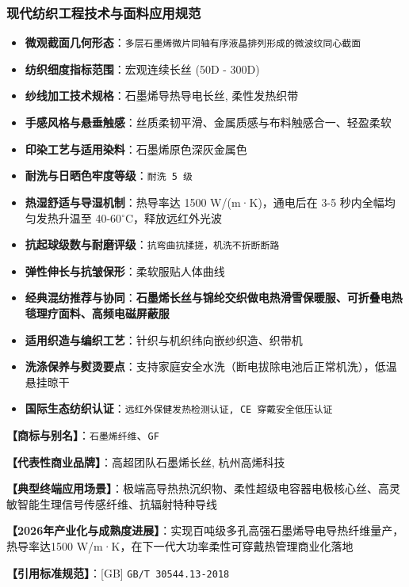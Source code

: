 \documentclass[11pt,openright,twoside,UTF8]{ctexbook}
\begin{document}
\subsubsection*{现代纺织工程技术与面料应用规范}
\begin{itemize} \setlength{\itemsep}{2pt}
    \item \textbf{微观截面几何形态}：\texttt{多层石墨烯微片同轴有序液晶排列形成的微波纹同心截面}
    \item \textbf{纺织细度指标范围}：宏观连续长丝 (50D - 300D)
    \item \textbf{纱线加工技术规格}：石墨烯导热导电长丝, 柔性发热织带
    \item \textbf{手感风格与悬垂触感}：丝质柔韧平滑、金属质感与布料触感合一、轻盈柔软
    \item \textbf{印染工艺与适用染料}：石墨烯原色深灰金属色
    \item \textbf{耐洗与日晒色牢度等级}：\texttt{耐洗 5 级}
    \item \textbf{热湿舒适与导湿机制}：热导率达 1500 W/(m·K)，通电后在 3-5 秒内全幅均匀发热升温至 40-60$^\circ\mathrm{C}$，释放远红外光波
    \item \textbf{抗起球级数与耐磨评级}：\texttt{抗弯曲抗揉搓，机洗不折断断路}
    \item \textbf{弹性伸长与抗皱保形}：柔软服贴人体曲线
    \item \textbf{经典混纺推荐与协同}：\textbf{石墨烯长丝与锦纶交织做电热滑雪保暖服、可折叠电热毯理疗面料、高频电磁屏蔽服}
    \item \textbf{适用织造与编织工艺}：针织与机织纬向嵌纱织造、织带机
    \item \textbf{洗涤保养与熨烫要点}：支持家庭安全水洗（断电拔除电池后正常机洗），低温悬挂晾干
    \item \textbf{国际生态纺织认证}：\texttt{远红外保健发热检测认证, CE 穿戴安全低压认证}
\end{itemize}
\vspace{0.2cm}

\noindent\textbf{【商标与别名】}：\texttt{石墨烯纤维}、\texttt{GF}\par
\noindent\textbf{【代表性商业品牌】}：高超团队石墨烯长丝, 杭州高烯科技\par
\noindent\textbf{【典型终端应用场景】}：极端高导热热沉织物、柔性超级电容器电极核心丝、高灵敏智能生理信号传感纤维、抗辐射特种导线\par
\noindent\textbf{【2026年产业化与成熟度进展】}：实现百吨级多孔高强石墨烯导电导热纤维量产，热导率达1500 W/m·K，在下一代大功率柔性可穿戴热管理商业化落地\par
\noindent\textbf{【引用标准规范】}：[GB] \texttt{GB/T 30544.13-2018}\par
\vspace{0.5cm}
\end{document}
